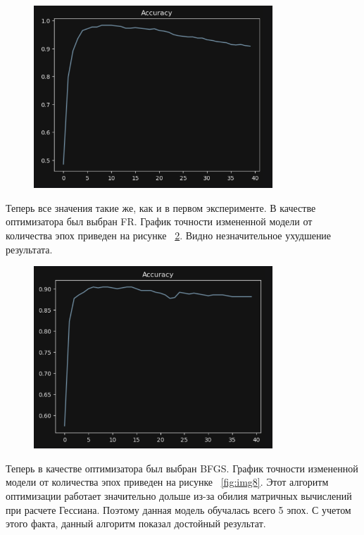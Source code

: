 \documentclass[a4paper, 14pt]{extarticle}
\begin{document}
\begin{figure}[H]
\centering
\includegraphics[width=0.8\textwidth]{images/res6.png}
\caption{}
\label{fig:img6}
\end{figure}

Теперь все значения такие же, как и в первом эксперименте. В качестве оптимизатора был выбран FR. График точности измененной модели от количества эпох приведен на рисунке ~\ref{fig:img7}. Видно незначительное ухудшение результата.

\begin{figure}[H]
\centering
\includegraphics[width=0.8\textwidth]{images/res7.png}
\caption{}
\label{fig:img7}
\end{figure}

Теперь в качестве оптимизатора был выбран BFGS. График точности измененной модели от количества эпох приведен на рисунке ~\ref{fig:img8}. Этот алгоритм оптимизации работает значительно дольше из-за обилия матричных вычислений при расчете Гессиана. Поэтому данная модель обучалась всего 5 эпох. С учетом этого факта, данный алгоритм показал достойный результат.
\end{document}
